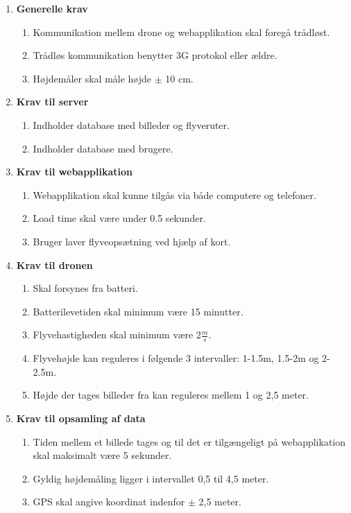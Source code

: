 \begin{enumerate}
\item \textbf{Generelle krav}
	\begin{enumerate}[label*=\arabic*.]
	\item Kommunikation mellem drone og webapplikation skal foregå trådløst.
	\item Trådløs kommunikation benytter 3G protokol eller ældre. 
	\item Højdemåler skal måle højde $\pm$ 10 cm.\\
	\end{enumerate}

\item \textbf{Krav til server}
	\begin{enumerate}[label*=\arabic*.]
	\item Indholder database med billeder og flyveruter.
	\item Indholder database med brugere.\\
	\end{enumerate}	

\item \textbf{Krav til webapplikation}
	\begin{enumerate}[label*=\arabic*.]
	\item Webapplikation skal kunne tilgås via både computere og telefoner.
	\item Load time skal være under 0.5 sekunder.
	\item Bruger laver flyveopsætning ved hjælp af kort.\\
	\end{enumerate}	
	

\item \textbf{Krav til dronen}
	\begin{enumerate}[label*=\arabic*.]
	\item Skal forsynes fra batteri.
	\item Batterilevetiden skal minimum være 15 minutter.
	\item Flyvehastigheden skal minimum være 2$\frac{m}{s}$.
	\item Flyvehøjde kan reguleres i følgende 3 intervaller: 1-1.5m, 1.5-2m og 2-2.5m.
	\item Højde der tages billeder fra kan reguleres mellem 1 og 2,5 meter.\\
	
	\end{enumerate}
	
\item \textbf{Krav til opsamling af data}
	\begin{enumerate} [label*=\arabic*.]
	\item Tiden mellem et billede tages og til det er tilgængeligt på webapplikation skal maksimalt være 5 sekunder.	
	\item Gyldig højdemåling ligger i intervallet 0,5 til 4,5 meter. 
	\item GPS skal angive koordinat indenfor $\pm$ 2,5 meter.\\
	\end{enumerate}
\end{enumerate}